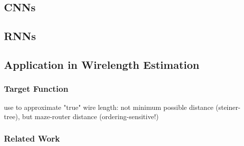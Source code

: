 \subsection{\glspl{CNN}}

\subsection{\glspl{RNN}}

\subsection{Application in Wirelength Estimation}

\subsubsection{Target Function}

use to approximate "true" wire length: not minimum possible distance (steiner-tree), but maze-router distance (ordering-sensitive!)

\subsubsection{Related Work}
